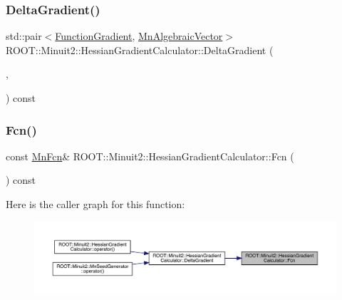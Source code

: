 \subsubsection{\texorpdfstring{DeltaGradient()}{DeltaGradient()}\hspace{0.1cm}{\footnotesize\ttfamily [2/2]}}
{\footnotesize\ttfamily std\+::pair$<$\mbox{\hyperlink{classROOT_1_1Minuit2_1_1FunctionGradient}{Function\+Gradient}}, \mbox{\hyperlink{namespaceROOT_1_1Minuit2_a62ed97730a1ca8d3fbaec64a19aa11c9}{Mn\+Algebraic\+Vector}}$>$ R\+O\+O\+T\+::\+Minuit2\+::\+Hessian\+Gradient\+Calculator\+::\+Delta\+Gradient (\begin{DoxyParamCaption}\item[{const \mbox{\hyperlink{classROOT_1_1Minuit2_1_1MinimumParameters}{Minimum\+Parameters}} \&}]{,  }\item[{const \mbox{\hyperlink{classROOT_1_1Minuit2_1_1FunctionGradient}{Function\+Gradient}} \&}]{ }\end{DoxyParamCaption}) const}

\mbox{\label{classROOT_1_1Minuit2_1_1HessianGradientCalculator_ae23f4348f9a64595c39db48aa48d9e09}} 
\subsubsection{\texorpdfstring{Fcn()}{Fcn()}\hspace{0.1cm}{\footnotesize\ttfamily [1/2]}}
{\footnotesize\ttfamily const \mbox{\hyperlink{classROOT_1_1Minuit2_1_1MnFcn}{Mn\+Fcn}}\& R\+O\+O\+T\+::\+Minuit2\+::\+Hessian\+Gradient\+Calculator\+::\+Fcn (\begin{DoxyParamCaption}{ }\end{DoxyParamCaption}) const\hspace{0.3cm}{\ttfamily [inline]}}

Here is the caller graph for this function\+:\nopagebreak
\begin{figure}[H]
\begin{center}
\leavevmode
\includegraphics[width=350pt]{dc/d17/classROOT_1_1Minuit2_1_1HessianGradientCalculator_ae23f4348f9a64595c39db48aa48d9e09_icgraph}
\end{center}
\end{figure}
\mbox{\label{classROOT_1_1Minuit2_1_1HessianGradientCalculator_ae23f4348f9a64595c39db48aa48d9e09}} 

